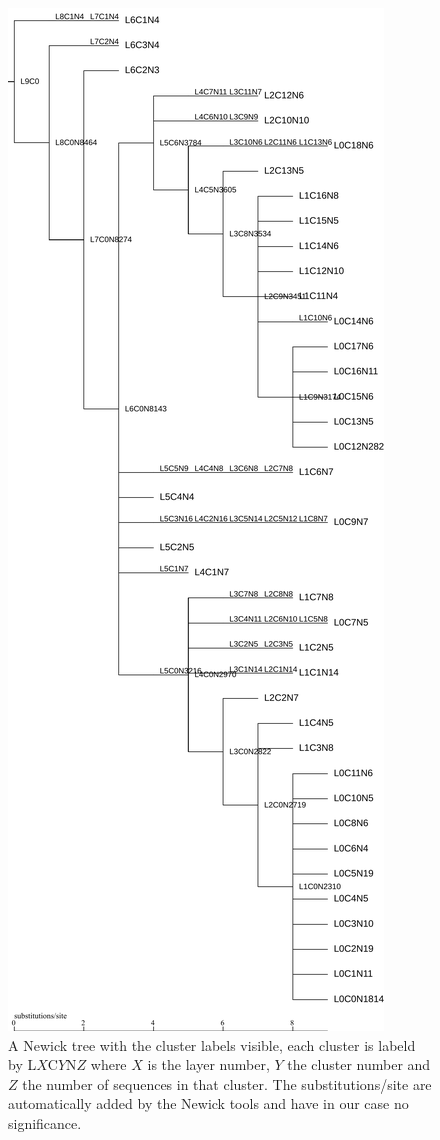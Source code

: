 \begin{figure}
  \begin{center}
    \includegraphics[scale=0.3]{nw-tree-tutorial.pdf}
    \caption{A Newick tree with the cluster labels visible, each
      cluster is labeld by L$X$C$Y$N$Z$ where $X$ is the layer number,
      $Y$ the cluster number and $Z$ the number of sequences in that
      cluster. The substitutions/site are automatically added by the
      Newick tools and have in our case no significance.}
    \label{fig-nwtree-tutorial}
  \end{center}
\end{figure}
